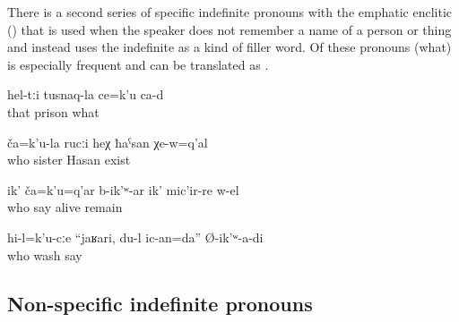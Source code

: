 There is a second series of specific indefinite pronouns with the emphatic enclitic  () that is used when the speaker does not remember a name of a person or thing and instead uses the indefinite as a kind of filler word. Of these pronouns  (what) is especially frequent and can be translated as . 
%
\begin{exe}
	\ex	\label{ex:These are the prison's whatchamacallits}
	\gll	hel-tːi	tusnaq-la	ce=k'u	ca-d\\
		that	prison	what	\\
	\glt	{}

	\ex	\label{ex:This one his sister, that Hasan who lives down there}
	\gll	ča=k'u-la	rucːi	heχ	ħaˁsan	χe-w=q'al\\
		who	sister		Hasan	exist\\
	\glt	{}

	\ex	\label{ex:This one, how is he called, he is still alive}
	\gll	ik'	ča=k'u=q'ar	b-ik'ʷ-ar	ik'	mic'ir-re	w-el\\
			who	say		alive	remain\\
	\glt	{}

	\ex	\label{ex:To someone I (masc.) said, well I will wash him}
	\gll	hi-l=k'u-cːe	``jaʁari,	du-l	ic-an=da''	Ø-ik'ʷ-a-di\\
		who			wash	say\\
	\glt	{}
\end{exe}



\subsection{Non-specific indefinite pronouns}
\label{ssec:Non-specific indefinite pronouns}


